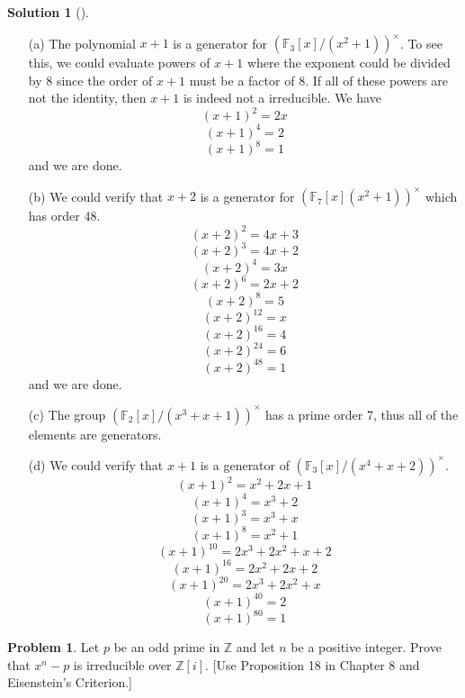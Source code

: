 \documentclass{article}
\theoremstyle{definition}
\newtheorem{prob}{Problem}
\newtheorem*{sol}{Solution}
\newenvironment{sols}[1][]{%
  \begin{sol}[#1]$ $\par\nobreak\ignorespaces
}{%
  \end{sol}
}
\begin{document}
\begin{sols}
	\begin{enumerate}
		\item[(a)] The polynomial $x + 1$ is a generator for $(\mathbb{F}_3[x]/(x^2 + 1))^\times$.
			To see this, we could evaluate powers of $x + 1$ where the exponent could be divided by 8 since the order of $x + 1$ must be a factor of 8.
			If all of these powers are not the identity, then $x + 1$ is indeed not a irreducible.
			We have
			\[
				(x + 1)^2 = 2x
			\]
			\[
				(x + 1)^4 = 2
			\]
			\[
				(x + 1)^8 = 1
			\]
			and we are done.
		\item[(b)] We could verify that $x + 2$ is a generator for $(\mathbb{F}_7[x](x^2 + 1))^\times$ which has order 48.
			\[
				(x + 2)^2 = 4x + 3
			\]
			\[
				(x + 2)^3 = 4x + 2
			\]
			\[
				(x + 2)^4 = 3x
			\]
			\[
				(x + 2)^6 = 2x + 2
			\]
			\[
				(x + 2)^8 = 5
			\]
			\[
				(x + 2)^{12} = x
			\]
			\[
				(x + 2)^{16} = 4
			\]
			\[
				(x + 2)^{24} = 6
			\]
			\[
				(x + 2)^{48} = 1
			\]
			and we are done.
		\item[(c)] The group $(\mathbb{F}_2[x]/(x^3 + x + 1))^\times$ has a prime order 7, thus all of the elements are generators.

		\item[(d)] We could verify that $x + 1$ is a generator of $(\mathbb{F}_3[x]/(x^4 + x + 2))^\times$.
			\[
				(x + 1)^2 = x^2 + 2x + 1
			\]
			\[
				(x + 1)^4 = x^3 + 2
			\]
			\[
				(x + 1)^3 = x^3 + x
			\]
			\[
				(x + 1)^8 = x^2 + 1
			\]
			\[
				(x + 1)^{10} = 2x^3 + 2x^2 + x + 2
			\]
			\[
				(x + 1)^{16} = 2x^2 + 2x + 2
			\]
			\[
				(x + 1)^{20} = 2x^3 + 2x^2 + x
			\]
			\[
				(x + 1)^{40} = 2
			\]
			\[
				(x + 1)^{80} = 1
			\]

	\end{enumerate}
\end{sols}

\begin{prob}
	Let $p$ be an odd prime in $\mathbb{Z}$ and let $n$ be a positive integer. Prove that $x^n - p$ is irreducible over $\mathbb{Z}[i]$. 
	[Use Proposition 18 in Chapter 8 and Eisenstein's Criterion.]
\end{prob}
\end{document}
